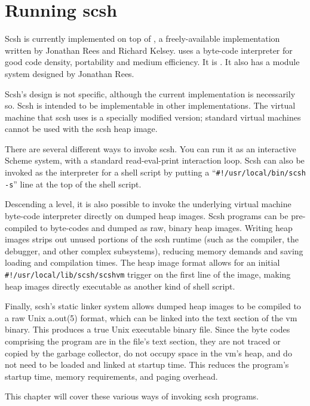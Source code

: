 
\chapter{Running scsh}
\label{chapt:running}

Scsh is currently implemented on top of {\scm}, a freely-available
{\Scheme} implementation written by Jonathan Rees and Richard Kelsey.
{\scm} uses a byte-code interpreter for good code density, portability
and medium efficiency. It is {\RnRS}.
It also has a module system designed by Jonathan Rees.

Scsh's design is not {\scm} specific, although the current implementation
is necessarily so.
Scsh is intended to be implementable in other {\Scheme} implementations.
The {\scm} virtual machine that scsh uses is a specially modified version;
standard {\scm} virtual machines cannot be used with the scsh heap image.

There are several different ways to invoke scsh.
You can run it as an interactive Scheme system, with a standard
read-eval-print interaction loop.
Scsh can also be invoked as the interpreter for a shell script by putting
a ``\verb|#!/usr/local/bin/scsh -s|'' line at the top of the shell script.

Descending a level, it is also possible to invoke the underlying virtual
machine byte-code interpreter directly on dumped heap images.
Scsh programs can be pre-compiled to byte-codes and dumped as raw,
binary heap images.
Writing heap images strips out unused portions of the scsh runtime
(such as the compiler, the debugger, and other complex subsystems),
reducing memory demands and saving loading and compilation times.
The heap image format allows for an initial \verb|#!/usr/local/lib/scsh/scshvm| trigger
on the first line of the image, making heap images directly executable as 
another kind of shell script.

Finally, scsh's static linker system allows dumped heap images to be compiled
to a raw Unix a.out(5) format, which can be linked into the text section
of the vm binary.
This produces a true Unix executable binary file.
Since the byte codes comprising the program are in the file's text section,
they are not traced or copied by the garbage collector, do not occupy space
in the vm's heap, and do not need to be loaded and linked at startup time.
This reduces the program's startup time, memory requirements,
and paging overhead.

This chapter will cover these various ways of invoking scsh programs.

